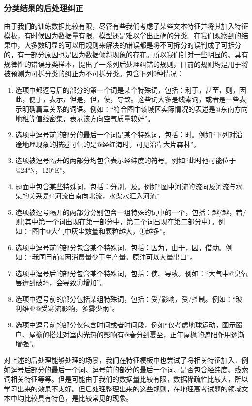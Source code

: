 \documentclass[master, winfont]{njuthesis}
\begin{document}
\subsubsection{分类结果的后处理纠正}
由于我们的训练数据比较有限，尽管有些我们考虑了某些文本特征并将其加入特征模板，有时候因为数据量有限，模型还是难以学出正确的分类。在我们观察到的结果中，大多数明显的可以用规则来解决的错误都是将不可拆分的误判成了可拆分的，有一部分原因也是因为数据倾斜现象的存在。所以我们针对一些明显的、具有规律性的错误分类样本，提出了一系列后处理纠错的规则，目前的规则均是用于将被预测为可拆分类的纠正为不可拆分类。包含下列9种情况：
\begin{enumerate}
	\item 选项中都逗号后的部分的第一个词是某个特殊词，包括：利于，甚至，则，因此，便于，表示，但是，但，使，导致。这些词大多是线索词，或者是一些表示明确篇章关系的词语。例如：“符合图中该城区实际情况的表述是@东南方向地租等值线密集，表示该方向空气质量较好”。
	\item 选项中逗号前的部分的最后一个词是某个特殊词，包括：时。例如“下列对沿途地理现象的描述可信的是@经红海时，可见沿岸大片森林”。
	\item 选项被逗号隔开的两部分均包含表示经纬度的符号。例如“此时他可能位于@24°N，120°E”。
	\item 题面中包含某些特殊词，包括：分别，及。例如“图中河流的流向及河流与水渠的关系是@河流自南向北流，水渠水汇入河流”
	\item 选项被逗号隔开的两部分分别包含一组特殊的词中的一个，包括：越/越，若/则(其中第一个词出现在第一部分中，第二个词出现在第二部分中）。例如：“图中@大气中灰尘数量和颗粒越大，①越多”。
	\item 选项中逗号前的部分包含某个特殊词，包括：因为，由于，因，借助。例如：“我国目前@因消费量少于生产量，原油可以大量出口”。
	\item 选项中逗号后的部分包含某个特殊词，包括：使、导致。例如：“大气中@臭氧层遭到破坏，会导致①增加”。
	\item 选项中逗号前的部分包括某组特殊词，包括：受/影响，受/控制。例如：“玻利维亚@受寒流影响，多雾少雨”。
	\item 选项中逗号前的部分仅包含时间或者时间段，例如“仅考虑地球运动，图示窗户、屋檐的搭建对室内光热的影响有@春分到夏至，正午屋檐的遮阳作用逐渐增强”。
\end{enumerate}

对上述的后处理能够处理的场景，我们在特征模板中也尝试了将相关特征加入，例如逗号后部分的最后一个词、逗号前的部分的最后一个词、是否包含经纬度、线索词相关特征等等。但是可能由于我们的数据量比较有限，数据稀疏性比较大，所以学习出来的效果不太好。但后处理整理出来的这些规则，在地理高考试题的领域文本中均比较具有特色，是比较常见的现象。
\end{document}
